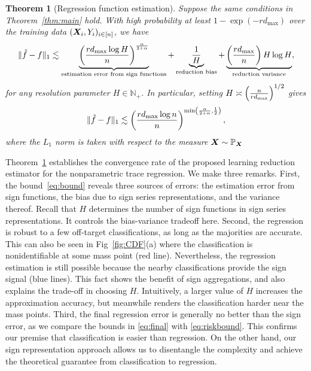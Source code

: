 \documentclass[11pt]{article}
\newcommand*{\KeepStyleUnderBrace}[1]{%
\mathop{%
\mathchoice
{\underbrace{\displaystyle#1}}%
{\underbrace{\textstyle#1}}%
{\underbrace{\scriptstyle#1}}%
{\underbrace{\scriptscriptstyle#1}}%
}\limits
}
\theoremstyle{plain}
\newtheorem{thm}{Theorem}[section]
\theoremstyle{definition}
\begin{document}
\begin{thm}[Regression function estimation]\label{thm:regression} 
Suppose the same conditions in Theorem~\ref{thm:main} hold. With high probability at least $1-\exp(-rd_{\max})$ over the training data $(\bm X_i,Y_i)_{i\in[n]}$, we have 
\begin{align}\label{eq:bound}
\onenormSize{}{\hat f-f} \lesssim \KeepStyleUnderBrace{\left({rd_{\max}\log H \over n}\right)^{\alpha \over 2+\alpha}}_{\text{estimation error from sign functions}}+\KeepStyleUnderBrace{1\over H}_{\text{reduction bias}}+\KeepStyleUnderBrace{\left({rd_{\max}\over n}\right)H \log H}_{\text{reduction variance}},
\end{align}
for any resolution parameter $H \in \mathbb{N}_{+}$. In particular, setting $H\asymp \left( {n\over rd_{\max}} \right)^{1/2}$ gives 
\begin{equation}\label{eq:final}
\lVert\hat f-f\rVert_1 \lesssim \left({rd_{\max} \log n\over n}\right)^{\min\left({\alpha\over 2+\alpha}, {1\over 2}\right)},
\end{equation}
where the $L_1$ norm is taken with respect to the measure $\bm X\sim\mathbb{P}_{\bm X}$
\end{thm}

\noindent
Theorem~\ref{thm:regression} establishes the convergence rate of the proposed learning reduction estimator for the nonparametric trace regression. We make three remarks. First, the bound~\eqref{eq:bound} reveals three sources of errors: the estimation error from sign functions, the bias due to sign series representations, and the variance thereof. Recall that $H$ determines the number of sign functions in sign series representations. It controls the bias-variance tradeoff here. Second, the regression is robust to a few off-target classifications, as long as the majorities are accurate. This can also be seen in Fig~\ref{fig:CDF}(a) where the classification is nonidentifiable at some mass point (red line). Nevertheless, the regression estimation is still possible because the nearby classifications provide the sign signal (blue lines). This fact shows the benefit of sign aggregations, and also explains the trade-off in choosing $H$. Intuitively, a larger value of $H$ increases the approximation accuracy, but meanwhile renders the classification harder near the mass points. Third, the final regression error is generally no better than the sign error, as we compare the bounds in \eqref{eq:final} with \eqref{eq:riskbound}. This confirms our premise that classification is easier than regression. On the other hand, our sign representation approach allows us to disentangle the complexity and achieve the theoretical guarantee from classification to regression.
\end{document}
